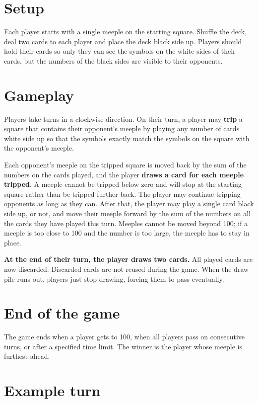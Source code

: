 \documentclass{article}
\begin{document}
\section*{Setup}

Each player starts with a single meeple on the starting square. Shuffle the deck, deal two cards to each player and place the deck black side up. Players should hold their cards so only they can see the symbols on the white sides of their cards, but the numbers of the black sides are visible to their opponents.

\section*{Gameplay}

Players take turns in a clockwise direction. On their turn, a player may \textbf{trip} a square that contains their opponent’s meeple by playing any number of cards white side up so that the symbols exactly match the symbols on the square with the opponent’s meeple.

Each opponent’s meeple on the tripped square is moved back by the sum of the numbers on the cards played, and the player \textbf{draws a card for each meeple tripped}. A meeple cannot be tripped below zero and will stop at the starting square rather than be tripped further back. The player may continue tripping opponents as long as they can. After that, the player may play a single card black side up, or not, and move their meeple forward by the sum of the numbers on all the cards they have played this turn. Meeples cannot be moved beyond 100; if a meeple is too close to 100 and the number is too large, the meeple has to stay in place. 

\textbf{At the end of their turn, the player draws two cards.} All played cards are now discarded. Discarded cards are not reused during the game. When the draw pile runs out, players just stop drawing, forcing them to pass eventually. 
 
\section*{End of the game}

The game ends when a player gets to 100, when all players pass on consecutive turns, or after a specified time limit. The winner is the player whose meeple is furthest ahead.

\section*{Example turn}
\end{document}

